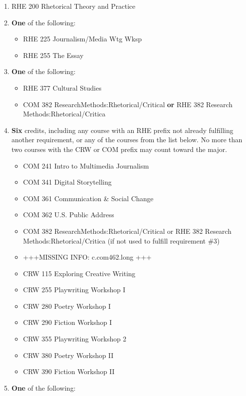 \documentclass[
  letterpaper,
]{scrbook}
\providecommand{\tightlist}{%
  \setlength{\itemsep}{0pt}\setlength{\parskip}{0pt}}
\begin{document}
\begin{enumerate}
\def\labelenumi{\arabic{enumi}.}
\item
  RHE 200 Rhetorical Theory and Practice
\item
  \textbf{One} of the following:

  \begin{itemize}
  \tightlist
  \item
    RHE 225 Journalism/Media Wtg Wksp
  \item
    RHE 255 The Essay
  \end{itemize}
\item
  \textbf{One} of the following:

  \begin{itemize}
  \tightlist
  \item
    RHE 377 Cultural Studies
  \item
    COM 382 ResearchMethods:Rhetorical/Critical \textbf{or} RHE 382
    Research Methods:Rhetorical/Critica
  \end{itemize}
\item
  \textbf{Six} credits, including any course with an RHE prefix not
  already fulfilling another requirement, or any of the courses from the
  list below. No more than two courses with the CRW or COM prefix may
  count toward the major.

  \begin{itemize}
  \tightlist
  \item
    COM 241 Intro to Multimedia Journalism
  \item
    COM 341 Digital Storytelling
  \item
    COM 361 Communication \& Social Change
  \item
    COM 362 U.S. Public Address
  \item
    COM 382 ResearchMethods:Rhetorical/Critical or RHE 382 Research
    Methods:Rhetorical/Critica (if not used to fulfill requirement \#3)
  \item
    +++MISSING INFO: c.com462.long +++
  \item
    CRW 115 Exploring Creative Writing
  \item
    CRW 255 Playwriting Workshop I
  \item
    CRW 280 Poetry Workshop I
  \item
    CRW 290 Fiction Workshop I
  \item
    CRW 355 Playwriting Workshop 2
  \item
    CRW 380 Poetry Workshop II
  \item
    CRW 390 Fiction Workshop II
  \end{itemize}
\item
  \textbf{One} of the following:


\end{enumerate}
\end{document}
